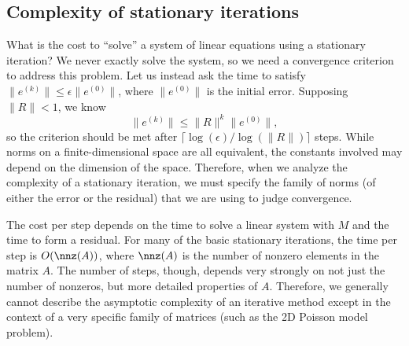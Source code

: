 \subsection{Complexity of stationary iterations}

What is the cost to ``solve'' a system of linear equations using a
stationary iteration?  We never exactly solve the system, so we need
a convergence criterion to address this problem.  Let us instead ask
the time to satisfy $\|e^{(k)}\| \leq \epsilon \|e^{(0)}\|$, where
$\|e^{(0)}\|$ is the initial error.  Supposing $\|R\| < 1$, we know
\[
  \|e^{(k)}\| \leq \|R\|^k \|e^{(0)}\|,
\]
so the criterion should be met
after $\lceil \log(\epsilon)/\log(\|R\|) \rceil$
steps.
While norms on a finite-dimensional space are all equivalent,
the constants involved may depend on the dimension of the space.
Therefore, when we analyze the complexity of a stationary iteration,
we must specify the family of norms (of either the error or the residual)
that we are using to judge convergence.

The cost per step depends on the time to solve a linear
system with $M$ and the time to form a residual.
For many of the basic stationary iterations, the time per step is
$O(\nnz(A))$, where $\nnz(A)$ is the number of nonzero elements in
the matrix $A$.  The number of steps, though, depends very strongly
on not just the number of nonzeros, but more detailed properties of
$A$.  Therefore, we generally cannot describe the asymptotic complexity
of an iterative method except in the context of a very specific family
of matrices (such as the 2D Poisson model problem).
